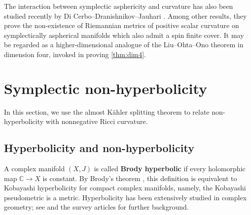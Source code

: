 \documentclass[11pt,twoside]{amsart}
\newcommand{\C}{\mathbb{C}}
\begin{document}
\begin{remark}
 The interaction between symplectic asphericity and curvature has also been studied recently by 
Di Cerbo--Dranishnikov--Jauhari \cite[\S5]{CDJ26}.
Among other results, they
prove the non-existence of Riemannian metrics of positive scalar curvature on symplectically aspherical manifolds which also admit a spin finite cover.
 It may be regarded as a higher-dimensional analogue of the Liu--Ohta--Ono theorem in dimension four, invoked in proving \autoref{thm:dim4}.
\end{remark}

\section{Symplectic non-hyperbolicity}\label{section:hyperbolic}
In this section, we use the almost K\"ahler splitting theorem  to relate non-hyperbolicity with nonnegative Ricci curvature.


\subsection{Hyperbolicity and non-hyperbolicity}
 A complex manifold $(X,J)$ is called {\bf Brody hyperbolic} if every holomorphic map $\C\to X$ is constant. 
By Brody's theorem \cite{Brody78}, this definition is equivalent to Kobayashi hyperbolicity for compact complex manifolds, namely, the Kobayashi pseudometric is a metric. 
Hyperbolicity has been extensively studied in complex geometry; see \cite{Kobayashibook,Langbook} and the survey articles \cite{Siu_survey,diverio_survey,Demailly_survey} for further background. 

\end{document}
